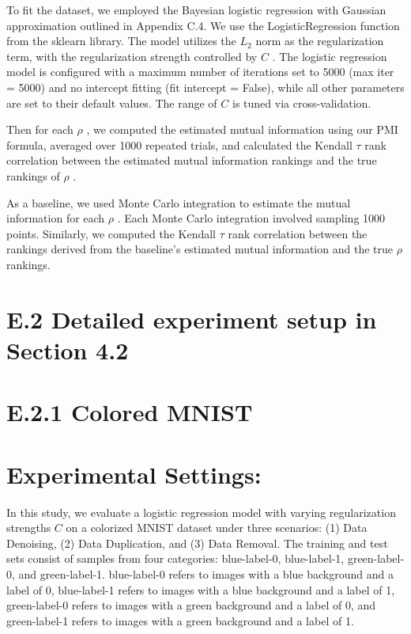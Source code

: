 To fit the dataset, we employed the Bayesian logistic regression with
Gaussian approximation outlined in Appendix C.4. We use the
LogisticRegression function from the sklearn library. The model utilizes
the \(L _ { 2 }\) norm as the regularization term, with the
regularization strength controlled by \(C\) . The logistic regression
model is configured with a maximum number of iterations set to 5000 (max
iter = 5000) and no intercept fitting (fit intercept = False), while all
other parameters are set to their default values. The range of \(C\) is
tuned via cross-validation.

Then for each \(\rho\) , we computed the estimated mutual information
using our PMI formula, averaged over 1000 repeated trials, and
calculated the Kendall \(\tau\) rank correlation between the estimated
mutual information rankings and the true rankings of \(\rho\) .

As a baseline, we used Monte Carlo integration to estimate the mutual
information for each \(\rho\) . Each Monte Carlo integration involved
sampling 1000 points. Similarly, we computed the Kendall \(\tau\) rank
correlation between the rankings derived from the baseline's estimated
mutual information and the true \(\rho\) rankings.

\section{E.2 Detailed experiment setup in Section
4.2}\label{e.2-detailed-experiment-setup-in-section-4.2}

\section{E.2.1 Colored MNIST}\label{e.2.1-colored-mnist}

\section{Experimental Settings:}\label{experimental-settings}

In this study, we evaluate a logistic regression model with varying
regularization strengths \(C\) on a colorized MNIST dataset under three
scenarios: (1) Data Denoising, (2) Data Duplication, and (3) Data
Removal. The training and test sets consist of samples from four
categories: blue-label-0, blue-label-1, green-label-0, and
green-label-1. blue-label-0 refers to images with a blue background and
a label of 0, blue-label-1 refers to images with a blue background and a
label of 1, green-label-0 refers to images with a green background and a
label of 0, and green-label-1 refers to images with a green background
and a label of 1.

